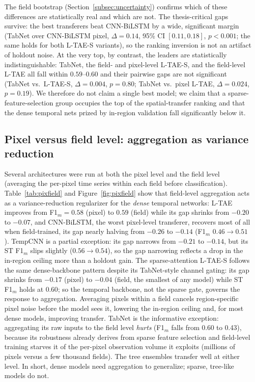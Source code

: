 \documentclass[pdflatex,sn-mathphys]{sn-jnl} %
\begin{document}
The field bootstrap (Section~\ref{subsec:uncertainty}) confirms which of these
differences are statistically real and which are not. The thesis-critical gaps survive:
the best transferers beat CNN-BiLSTM by a wide, significant margin (TabNet over
CNN-BiLSTM pixel, $\Delta=0.14$, 95\% CI $[0.11, 0.18]$, $p<0.001$; the same holds for
both L-TAE-S variants), so the ranking inversion is not an artifact of holdout noise.
At the very top, by contrast, the leaders are statistically indistinguishable: TabNet,
the field- and pixel-level L-TAE-S, and the field-level L-TAE all fall within
$0.59$--$0.60$ and their pairwise gaps are not significant (TabNet vs.\ L-TAE-S,
$\Delta=0.004$, $p=0.80$; TabNet vs.\ pixel L-TAE, $\Delta=0.024$, $p=0.19$). We
therefore do not claim a single best model; we claim that a sparse-feature-selection
group occupies the top of the spatial-transfer ranking and that the dense temporal nets
prized by in-region validation fall significantly below it.

\subsection{Pixel versus field level: aggregation as variance reduction}
\label{subsec:pixel_field}

Several architectures were run at both the pixel level and the field level (averaging
the per-pixel time series within each field before classification). Table~\ref{tab:pixfield}
and Figure~\ref{fig:pixfield} show that field-level aggregation acts as a
variance-reduction regularizer for the \emph{dense} temporal networks: L-TAE improves
from F1$_m=0.58$ (pixel) to $0.59$ (field) while its gap shrinks from $-0.20$ to
$-0.07$, and CNN-BiLSTM, the worst pixel-level transferer, recovers most of all when
field-trained, its gap nearly halving from $-0.26$ to $-0.14$ (F1$_m$ $0.46\rightarrow0.51$).
TempCNN is a partial exception: its gap narrows from $-0.21$ to $-0.14$, but its
ST F1$_m$ slips slightly ($0.56\rightarrow0.54$), so the gap narrowing reflects a
drop in the in-region ceiling more than a holdout gain. The sparse-attention L-TAE-S follows
the same dense-backbone pattern despite its TabNet-style channel gating: its gap shrinks
from $-0.17$ (pixel) to $-0.04$ (field, the smallest of any model) while ST F1$_m$ holds
at $0.60$; so the temporal backbone, not the sparse gate, governs the response to
aggregation. Averaging pixels within a
field cancels region-specific pixel noise before the model sees it, lowering the
in-region ceiling and, for most dense models, improving transfer. TabNet is the informative exception:
aggregating its raw inputs to the field level \emph{hurts} (F1$_m$ falls from 0.60 to
0.43), because its robustness already derives from sparse feature selection and
field-level training starves it of the per-pixel observation volume it exploits (millions of
pixels versus a few thousand fields). The tree ensembles transfer well at either level.
In short, dense models need aggregation to generalize; sparse, tree-like models do not.
\end{document}
